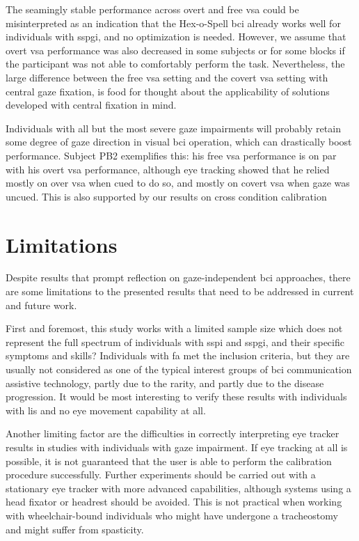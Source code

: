The seamingly stable performance across overt and free \ac{vsa} could be
misinterpreted as an indication that the Hex-o-Spell \ac{bci} already works
well for individuals with \ac{sspgi}, and no optimization is
needed.
However, we assume that overt \ac{vsa} performance was also decreased in some
subjects or for some blocks if the participant was not able to comfortably
perform the task.
Nevertheless, the large difference between the free \ac{vsa} setting and the
covert \ac{vsa} setting
with central gaze fixation, is food for thought about the applicability of
solutions developed with central fixation in mind.

Individuals with all but the most severe gaze impairments will probably retain
some degree of gaze direction in visual \ac{bci} operation, which can
drastically boost performance.
Subject PB2 exemplifies this: his free \ac{vsa} performance is on par with his
overt \ac{vsa} performance, although eye tracking showed that he relied mostly
on over \ac{vsa} when cued to do so, and mostly on covert \ac{vsa} when
gaze was uncued.
This is also supported by our results on cross condition calibration


\section{Limitations}

Despite results that prompt reflection on gaze-independent \ac{bci} approaches,
there are some limitations to the presented results that need to be
addressed in current and future work.

First and foremost, this study works with a limited sample size which
does not represent the full spectrum of individuals with \ac{sspi} and
\ac{sspgi}, and their specific symptoms and skills?
Individuals with \ac{fa} met the inclusion criteria, but they are usually not
considered as one of the typical interest groups of \ac{bci} communication assistive
technology, partly due to the rarity, and partly due to the disease
progression.
It would be most interesting to verify these results with individuals with
\ac{lis} and no eye movement capability at all.


Another limiting factor are the difficulties in correctly interpreting eye
tracker results in studies with individuals with gaze impairment.
If eye tracking at all is possible, it is not guaranteed that the user is able
to perform the calibration procedure successfully.
Further experiments should be carried out with a stationary eye tracker with
more advanced capabilities, although systems using a head fixator or headrest
should be avoided.
This is not practical when working with
wheelchair-bound individuals who might have undergone a tracheostomy and might
suffer from spasticity.

